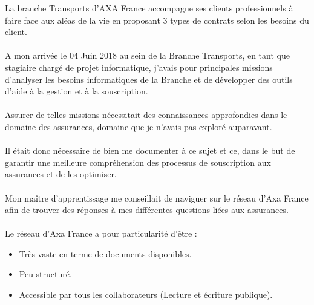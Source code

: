 \documentclass[12pt, a4paper, oneside]{book}
\begin{document}
La branche Transports d'AXA France accompagne ses clients professionnels à faire face aux aléas de la vie en proposant 3 types de contrats selon les besoins du client.


\paragraph{}

A mon arrivée le 04 Juin 2018 au sein de la Branche Transports, en tant que stagiaire chargé de projet informatique, j'avais pour principales missions d'analyser les besoins informatiques de la Branche et de développer des outils d'aide à la gestion et à la souscription.


\paragraph{}

Assurer de telles missions nécessitait des connaissances approfondies dans le domaine des assurances, domaine que je n'avais pas exploré auparavant.

\paragraph{}
Il était donc nécessaire de bien me documenter à ce sujet et ce, dans le but de garantir une meilleure compréhension des processus de souscription aux assurances et de les optimiser.

\paragraph{}

Mon maître d'apprentissage me conseillait de naviguer sur le réseau d'Axa France afin de trouver des réponses à mes différentes questions liées aux assurances. 
 
\paragraph{}

Le réseau d'Axa France a pour particularité d'être : 

\begin{itemize}
\item Très vaste en terme de documents disponibles.
\item Peu structuré.
\item Accessible par tous les collaborateurs (Lecture et écriture publique).
\end{itemize}
\end{document}
